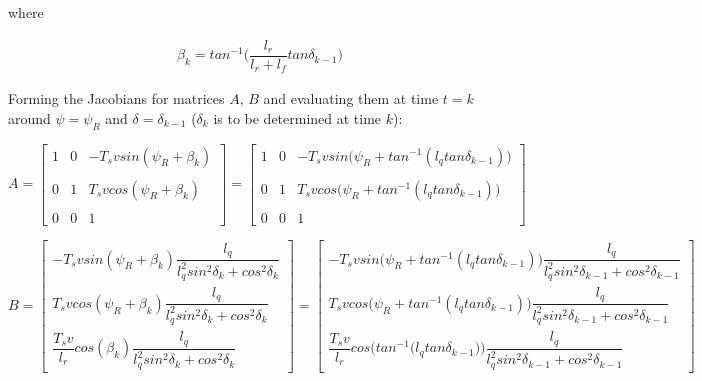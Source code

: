 where

\begin{align}
  \beta_k = tan^{-1}\Big(\dfrac{l_r}{l_r + l_f} tan\delta_{k-1}\Big)
\end{align}


Forming the Jacobians for matrices $A$, $B$ and evaluating them at time
$t=k$ around $\psi = \psi_R$ and $\delta = \delta_{k-1}$ ($\delta_k$ is to be determined at time $k$):

\begin{equation}
 A =
  \begin{bmatrix}
    1 & 0 & -T_s v sin(\psi_R + \beta_k) \\\\
    0 & 1 & T_s v cos(\psi_R + \beta_k) \\\\
    0 & 0 & 1
  \end{bmatrix}
  =
  \begin{bmatrix}
    1 & 0 & -T_s v sin\Big(\psi_R + tan^{-1} (l_q tan\delta_{k-1})\Big) \\\\
    0 & 1 & T_s v cos\Big(\psi_R + tan^{-1} (l_q tan\delta_{k-1})\Big) \\\\
    0 & 0 & 1
  \end{bmatrix}
\end{equation}


\begin{equation}
 B =
  \begin{bmatrix}
    -T_s v sin(\psi_R + \beta_k) \dfrac{l_q}{l_q^2 sin^2\delta_k + cos^2\delta_k} \\
    T_s v cos(\psi_R + \beta_k) \dfrac{l_q}{l_q^2 sin^2\delta_k + cos^2\delta_k} \\
    \dfrac{T_s v}{l_r} cos(\beta_k) \dfrac{l_q}{l_q^2 sin^2\delta_k + cos^2\delta_k}
  \end{bmatrix}
  =
  \begin{bmatrix}
    -T_s v sin\Big(\psi_R + tan^{-1} (l_q tan\delta_{k-1})\Big) \dfrac{l_q}{l_q^2 sin^2\delta_{k-1} + cos^2\delta_{k-1}} \\
    T_s v cos\Big(\psi_R + tan^{-1} (l_q tan\delta_{k-1})\Big) \dfrac{l_q}{l_q^2 sin^2\delta_{k-1} + cos^2\delta_{k-1}} \\
    \dfrac{T_s v}{l_r} cos\Bigg(tan^{-1} \Big(l_q tan\delta_{k-1}\Big)\Bigg) \dfrac{l_q}{l_q^2 sin^2\delta_{k-1} + cos^2\delta_{k-1}}
  \end{bmatrix}
\end{equation}


